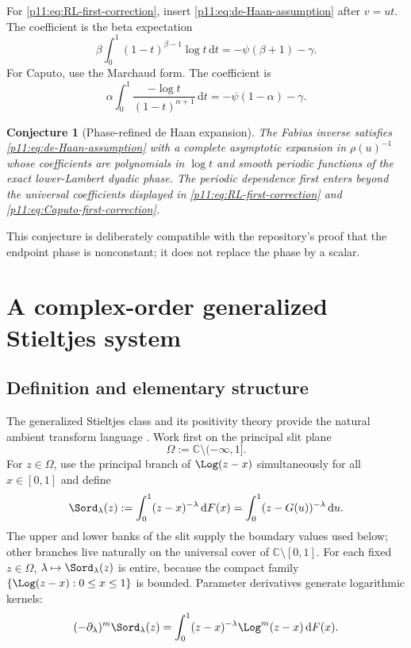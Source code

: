 \documentclass[11pt,oneside]{article}
\newtheorem{conjecture}[theorem]{Conjecture}
\theoremstyle{definition}
\theoremstyle{remark}
\newcommand{\C}{\mathbb C}
\newcommand{\dd}{\,\mathrm d}
\newcommand{\1}{\mathbf 1}
\begin{document}
\begin{proofidea}
For \eqref{p11:eq:RL-first-correction}, insert
\eqref{p11:eq:de-Haan-assumption} after $v=ut$.  The coefficient is the beta
expectation
\begin{equation}
 \beta\int_0^1(1-t)^{\beta-1}\log t\dd t
 =-\psi(\beta+1)-\gamma.
\end{equation}
For Caputo, use the Marchaud form.  The coefficient is
\begin{equation}
 \alpha\int_0^1\frac{-\log t}{(1-t)^{\alpha+1}}\dd t
 =-\psi(1-\alpha)-\gamma.
\end{equation}
\end{proofidea}

\begin{conjecture}[Phase-refined de Haan expansion]
\label{p11:conj:de-Haan}
The Fabius inverse satisfies \eqref{p11:eq:de-Haan-assumption} with a complete
asymptotic expansion in $\rho(u)^{-1}$ whose coefficients are polynomials in
$\log t$ and smooth periodic functions of the exact lower-Lambert dyadic
phase.  The periodic dependence first enters beyond the universal
coefficients displayed in \eqref{p11:eq:RL-first-correction} and
\eqref{p11:eq:Caputo-first-correction}.
\end{conjecture}

This conjecture is deliberately compatible with the repository's proof that
the endpoint phase is nonconstant; it does not replace the phase by a scalar.

\section{A complex-order generalized Stieltjes system}
\label{p11:sec:stieltjes}

\subsection{Definition and elementary structure}

The generalized Stieltjes class and its positivity theory provide the
natural ambient transform language \cite{p11:Sokal}.  Work first on the principal
slit plane
\begin{equation}
 \Omega:=\C\setminus(-\infty,1].
\end{equation}
For $z\in\Omega$, use the principal branch of $\Log(z-x)$ simultaneously for
all $x\in[0,1]$ and define
\begin{equation}
 \Sord_\lambda(z)
 :=\int_0^1(z-x)^{-\lambda}\dd F(x)
 =\int_0^1(z-G(u))^{-\lambda}\dd u.
 \label{p11:eq:generalized-Stieltjes-def}
\end{equation}
The upper and lower banks of the slit supply the boundary values used below;
other branches live naturally on the universal cover of
$\C\setminus[0,1]$.  For each fixed $z\in\Omega$,
$\lambda\mapsto\Sord_\lambda(z)$ is entire, because the compact family
$\{\Log(z-x):0\le x\le1\}$ is bounded.  Parameter derivatives
generate logarithmic kernels:
\begin{equation}
 (-\partial_\lambda)^m\Sord_\lambda(z)
 =\int_0^1(z-x)^{-\lambda}\Log^m(z-x)\dd F(x).
 \label{p11:eq:lambda-log-kernels}
\end{equation}
\end{document}
